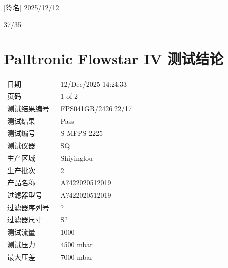 \documentclass[UTF8,10pt,a4paper,fontset=fandol]{ctexart}
\newcommand{\fieldvalue}[1]{#1}
\newcommand{\handwritten}[1]{#1}
\begin{document}
\vspace{1em}
\noindent
\fieldvalue{\handwritten{[签名]}}
\hspace{1em}
\fieldvalue{\handwritten{2025/12/12}}

\vfill
\handwritten{37/35}

\newpage

\section{Palltronic Flowstar IV 测试结论}

\begin{tabular}{@{}p{0.30\linewidth}p{0.62\linewidth}@{}}
日期 &
\fieldvalue{12/Dec/2025 14:24:33}
\\
页码 &
\fieldvalue{1 of 2}
\\
测试结果编号 &
\fieldvalue{FPS041GR/2426 22/17}
\\
测试结果 &
\fieldvalue{Pass}
\\
测试编号 &
\fieldvalue{S-MFPS-2225}
\\
测试仪器 &
\fieldvalue{SQ}
\\
生产区域 &
\fieldvalue{Shiyinglou}
\\
生产批次 &
\fieldvalue{2}
\\
产品名称 &
\fieldvalue{A?422020512019}
\\
过滤器型号 &
\fieldvalue{A?422020512019}
\\
过滤器序列号 &
\fieldvalue{?}
\\
过滤器尺寸 &
\fieldvalue{S?}
\\
测试流量 &
\fieldvalue{1000}
\\
测试压力 &
\fieldvalue{4500 mbar}
\\
最大压差 &
\fieldvalue{7000 mbar}
\end{tabular}
\end{document}
